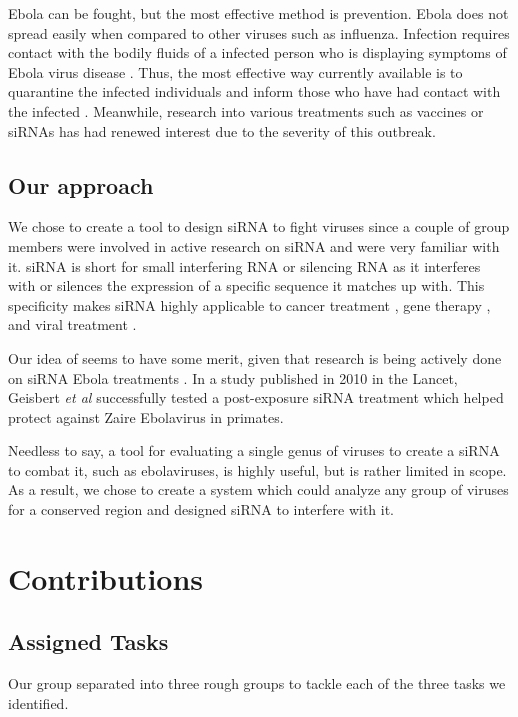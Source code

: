 \documentclass[10pt,letterpaper]{article}
\begin{document}
Ebola can be fought, but the most effective method is prevention.
Ebola does not spread easily when compared to other viruses such as influenza.
Infection requires contact with the bodily fluids of a infected person who is displaying symptoms of Ebola virus disease \cite{wongcharacterization} \cite{team2014ebola}.
Thus, the most effective way currently available is to quarantine the infected individuals and inform those who have had contact with the infected \cite{team2014ebola}.
Meanwhile, research into various treatments such as vaccines \cite{geisbert2015emergency} or siRNAs \cite{lipid} has had renewed interest due to the severity of this outbreak.


\subsection{Our approach}
We chose to create a tool to design siRNA to fight viruses since a couple of group members were involved in active research on siRNA and were very familiar with it.
siRNA is short for small interfering RNA or silencing RNA as it interferes with or silences the expression of a specific sequence it matches up with.
This specificity  makes siRNA highly applicable to cancer treatment \cite{chen2010nanoparticles}, gene therapy \cite{kim2006peg}, and viral treatment \cite{gitlin2002short}.


Our idea of seems to have some merit, given that research is being actively done on siRNA Ebola treatments \cite{lipid} \cite{kugelman2015evaluation} \cite{geisbert2010postexposure}.
In a study published in 2010 in the Lancet, Geisbert \textit{et al} \cite{geisbert2010postexposure} successfully tested a post-exposure siRNA treatment which helped protect against Zaire Ebolavirus in primates.

Needless to say, a tool for evaluating a single genus of viruses to create a siRNA to combat it, such as ebolaviruses, is highly useful, but is rather limited in scope.
As a result, we chose to create a system which could analyze any group of viruses for a conserved region and designed siRNA to interfere with it.

\section{Contributions}




\subsection{Assigned Tasks}
Our group separated into three rough groups to tackle each of the three tasks we identified.
\end{document}
